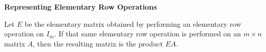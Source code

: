 \nopagenumbers
{\bf Representing Elementary Row Operations}
\vskip 1mm

\vskip 6pt
Let $E$ be the elementary matrix obtained by performing an elementary row operation on $I_m$. If that same elementary row operation is performed on an $m\times n$ matrix $A$, then the resulting matrix is the product $EA$.

\vfill\eject
\bye
